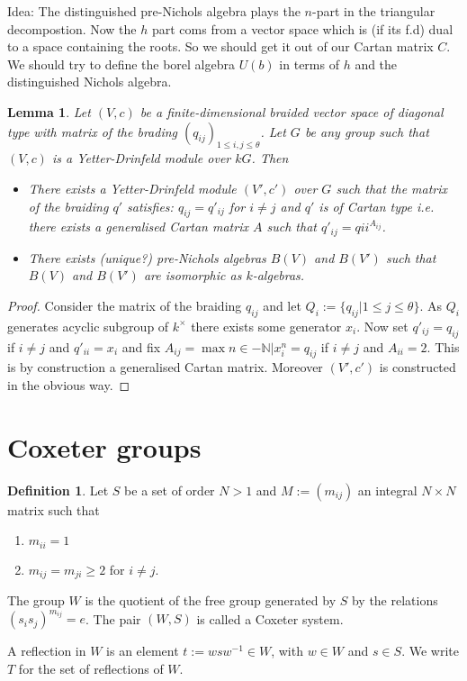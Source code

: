\documentclass{amsart}
\newtheorem{lemma}{Lemma}
\theoremstyle{definition}
\newtheorem{definition}{Definition}
\begin{document}
	Idea: The distinguished pre-Nichols algebra plays the $n$-part in the triangular decompostion. Now  the $h$ part coms from a vector space which is (if its f.d) dual to a space containing the roots.
	So we should get it out of our Cartan matrix $C$.
	We should try to define the borel algebra $U(b)$ in terms of $h$ and the distinguished Nichols algebra.
	\begin{lemma}
		Let $(V,c)$ be a finite-dimensional braided vector space of diagonal type with matrix of the brading $(q_{ij})_{1 \leq i,j \leq \theta}$.
		Let $G$ be any group such that $(V,c)$ is a Yetter-Drinfeld module over $kG$.
		Then
		\begin{itemize}
			\item There exists a Yetter-Drinfeld module $(V',c')$ over $G$ such that
			the matrix of the braiding $q'$ satisfies:
			$q_{ij} = q'_{ij}$ for $i \neq j$ and $q'$ is of Cartan type i.e. there exists a generalised Cartan matrix $A$ such that $q'_{ij}= q{ii}^{A_{ij}}$.
			\item There exists (unique?) pre-Nichols algebras $B(V)$ and $B(V')$ such that $B(V)$ and $B(V')$ are isomorphic as $k$-algebras. 
		\end{itemize}		
	\end{lemma}
	
	\begin{proof}
		Consider the matrix of the braiding $q_{ij}$ and let $Q_i:=\{q_{ij}|1 \leq j \leq \theta\}$.
		As $Q_i$ generates acyclic subgroup of $k^\times$ there exists some generator $x_{i}$. Now set $q'_{ij}= q_{ij}$ if $i\neq j$ and $q'_{ii}=x_i$ and fix 
		$A_{ij}= \max{n\in -\mathbb N | x_i^n=q_{ij} }$ if $i \neq j$ and  $A_{ii}=2$. This is by construction a generalised Cartan matrix.
		Moreover $(V',c')$ is constructed in the obvious way.
	\end{proof}

\section{Coxeter groups}

\begin{definition}
	Let $S$ be a set of order $N>1$ and $M:=(m_{ij})$ an integral $N\times N$ matrix such that
	\begin{enumerate}
		\item $m_{ii}=1$
		\item $m_{ij} = m_{ji} \geq 2 $ for $i \neq j$.
	\end{enumerate} 
	The group $W$ is the quotient of the free group generated by $S$ by the relations
	$(s_i s_j)^{m_{ij}}=e$. The pair $(W, S)$ is called a Coxeter system.
	
	A reflection in $W$ is an element $t:= wsw^{-1}\in W$, with $w \in W$ and $s\in S$. We write $T$ for the set of reflections of $W$. 
\end{definition}
\end{document}
